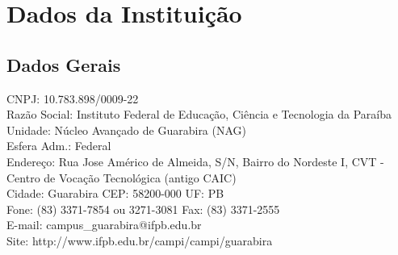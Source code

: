 \section{Dados da Institui\c{c}\~ao}
\subsection{Dados Gerais}
\hspace{-0.3in}  CNPJ:	10.783.898/0009-22
\\Razão Social:	Instituto Federal de Educação, Ciência e Tecnologia da Paraíba
\\Unidade:	Núcleo Avançado de Guarabira (NAG)
\\Esfera Adm.:	Federal
\\Endereço:	Rua Jose Américo de Almeida, S/N, Bairro do Nordeste I, CVT - Centro de Vocação Tecnológica (antigo CAIC)
\\Cidade:	Guarabira     CEP: 58200-000   UF: PB
\\Fone:	 (83) 3371-7854 ou 3271-3081	Fax:	(83) 3371-2555
\\E-mail:	campus\_guarabira@ifpb.edu.br		
\\Site:	http://www.ifpb.edu.br/campi/campi/guarabira
